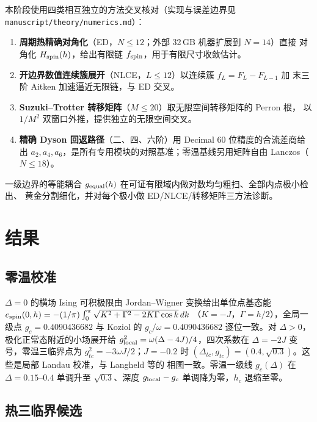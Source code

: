\documentclass[UTF8,11pt,a4paper]{ctexart}
\begin{document}
本阶段使用四类相互独立的方法交叉核对（实现与误差边界见 \texttt{manuscript/theory/numerics.md}）：

\begin{enumerate}
  \item \textbf{周期热精确对角化}（ED，$N\le12$；外部 32\,GB 机器扩展到 $N=14$）直接
        对角化 $H_{\rm spin}(h)$，给出有限链 $f_{\rm spin}$，用于有限尺寸收敛估计。
  \item \textbf{开边界数值连续簇展开}（NLCE，$L\le12$）以连续簇 $f_L=F_L-F_{L-1}$ 加
        末三阶 Aitken 加速逼近无限链，与 ED 交叉。
  \item \textbf{Suzuki--Trotter 转移矩阵}（$M\le20$）取无限空间转移矩阵的 Perron 根，
        以 $1/M^2$ 双窗口外推，提供独立的无限空间交叉。
  \item \textbf{精确 Dyson 回返路径}（二、四、六阶）用 Decimal 60 位精度的合流差商给出
        $a_2,a_4,a_6$，是所有专用模块的对照基准；零温基线另用矩阵自由 Lanczos（$N\le18$）。
\end{enumerate}

一级边界的等能耦合 $g_{\rm equal}(h)$ 在可证有限域内做对数均匀粗扫、全部内点极小检出、
黄金分割细化，并对每个极小做 ED/NLCE/转移矩阵三方法诊断。

\section{结果}

\subsection{零温校准}

$\Delta=0$ 的横场 Ising 可积极限由 Jordan--Wigner 变换给出单位点基态能
$e_{\rm spin}(0,h)=-(1/\pi)\int_0^\pi\sqrt{K^2+\Gamma^2-2K\Gamma\cos k}\,dk$
（$K=-J$，$\Gamma=h/2$），全局一级点 $g_c=0.4090436682$ 与 Koziol 的
$g_c/\omega=0.4090436682$ 逐位一致\cite{Koziol2026Criticality}。对 $\Delta>0$，
极化正常态附近的小场展开给 $g_{\rm local}^2=\omega(\Delta-4J)/4$，四次系数在
$\Delta=-2J$ 变号，零温三临界点为 $g_{tc}^2=-3\omega J/2$；$J=-0.2$ 时
$(\Delta_{tc},g_{tc})=(0.4,\sqrt{0.3})$。这些是局部 Landau 校准，与 Langheld 等的
相图一致\cite{Langheld2025Wormhole}。零温一级线 $g_c(\Delta)$ 在 $\Delta=0.15$--$0.4$
单调升至 $\sqrt{0.3}$、深度 $g_{\rm local}-g_c$ 单调降为零，$h_c$ 退缩至零。

\subsection{热三临界候选}
\end{document}
